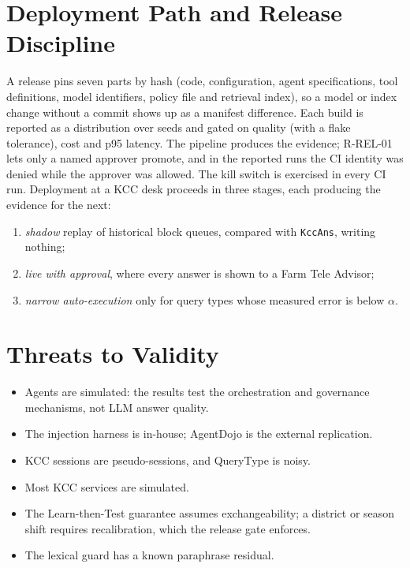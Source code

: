 

\section{Deployment Path and Release Discipline}
\label{sec:gov-release}

A release pins seven parts by hash (code, configuration, agent specifications, tool definitions, model
identifiers, policy file and retrieval index), so a model or index change without a commit shows up as
a manifest difference. Each build is reported as a distribution over seeds and gated on quality (with a
flake tolerance), cost and p95 latency. The pipeline produces the evidence; R-REL-01 lets only a named
approver promote, and in the reported runs the CI identity was denied while the approver was allowed.
The kill switch is exercised in every CI run. Deployment at a KCC desk proceeds in three stages, each
producing the evidence for the next:
\begin{enumerate}
  \item \emph{shadow} replay of historical block queues, compared with \texttt{KccAns}, writing nothing;
  \item \emph{live with approval}, where every answer is shown to a Farm Tele Advisor;
  \item \emph{narrow auto-execution} only for query types whose measured error is below $\alpha$.
\end{enumerate}

\section{Threats to Validity}
\label{sec:gov-threats}

\begin{itemize}
  \item Agents are simulated: the results test the orchestration and governance mechanisms, not LLM
        answer quality.
  \item The injection harness is in-house; AgentDojo \citep{debenedetti2024agentdojo} is the external
        replication.
  \item KCC sessions are pseudo-sessions, and QueryType is noisy.
  \item Most KCC services are simulated.
  \item The Learn-then-Test guarantee assumes exchangeability; a district or season shift requires
        recalibration, which the release gate enforces.
  \item The lexical guard has a known paraphrase residual.
\end{itemize}

